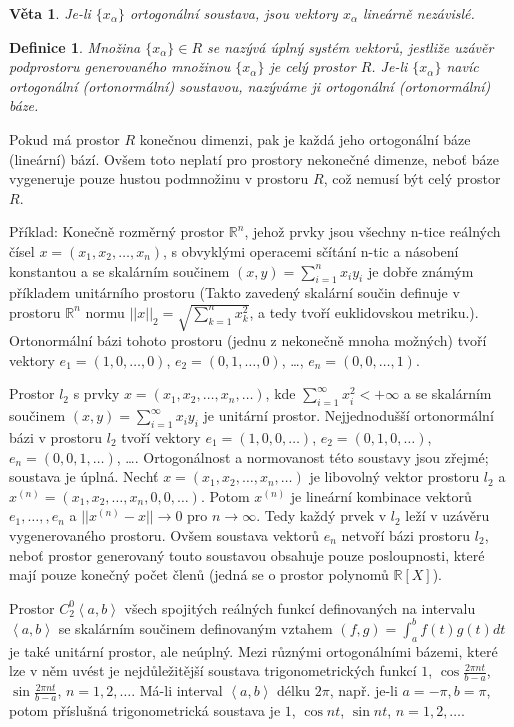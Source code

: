 \documentclass[a4paper, 11pt]{report}
\newtheorem{mydef}{Definice}[chapter]
\newtheorem{veta}{Věta}[chapter]
\begin{document}
\begin{veta}
Je-li $\{x_\alpha\}$ ortogonální soustava, jsou vektory $x_\alpha$ lineárně nezávislé.
\end{veta}

\begin{mydef}
Množina $\{x_\alpha\} \in R$ se nazývá úplný systém vektorů, jestliže uzávěr podprostoru generovaného množinou $\{x_\alpha\}$ je celý prostor $R$. Je-li $\{x_\alpha\}$ navíc ortogonální (ortonormální) soustavou, nazýváme ji \emph{ortogonální (ortonormální) báze}.
\end{mydef}

Pokud má prostor $R$ konečnou dimenzi, pak je každá jeho ortogonální báze (lineární) bází. Ovšem toto neplatí pro prostory nekonečné dimenze, neboť báze vygeneruje pouze hustou podmnožinu v prostoru $R$, což nemusí být celý prostor $R$.

Příklad: Konečně rozměrný prostor $\mathbb{R}^n$, jehož prvky jsou všechny n-tice reálných čísel
$x = (x_1, x_2, \dots, x_n)$,
s obvyklými operacemi sčítání n-tic a násobení konstantou a se skalárním součinem
$(x, y) = \sum\limits_{i = 1}^n x_i y_i$
je dobře známým příkladem unitárního prostoru (Takto zavedený skalární součin definuje v prostoru $\mathbb{R}^n$ normu $||x||_2 = \sqrt{\sum\limits_{k=1}^n x_k^2}$,
a tedy tvoří euklidovskou metriku.). Ortonormální bázi tohoto prostoru (jednu z nekonečně mnoha možných) tvoří vektory
$ e_1 = (1, 0, \dots, 0) $,
$ e_2 = (0, 1, \dots, 0) $,
\dots,
$ e_n = (0, 0, \dots, 1) $.

Prostor $l_2$ s prvky
$x = (x_1, x_2, \dots, x_n, \dots)$, kde $\sum\limits_{i=1}^\infty x_i^2 < + \infty$
a se skalárním součinem $(x, y) = \sum\limits_{i=1}^\infty x_i y_i$
je unitární prostor. Nejjednodušší ortonormální bázi v prostoru $l_2$ tvoří vektory
$ e_1 = (1, 0, 0, \dots) $,
$ e_2 = (0, 1, 0, \dots) $,
$ e_n = (0, 0, 1, \dots) $,
\dots.
Ortogonálnost a normovanost této soustavy jsou zřejmé; soustava je úplná. Nechť $x = (x_1, x_2, \dots, x_n, \dots)$ je libovolný vektor prostoru $l_2$ a $x^{(n)} = (x_1, x_2, \dots, x_n, 0, 0, \dots)$. Potom $x^{(n)}$ je lineární kombinace vektorů $e_1, \dots, ,e_n$ a $||x^{(n)} - x|| \to 0$ pro $n \to \infty$.
Tedy každý prvek v $l_2$ leží v uzávěru vygenerovaného prostoru. Ovšem soustava vektorů $e_n$ netvoří bázi prostoru $l_2$, neboť prostor generovaný touto soustavou obsahuje pouze posloupnosti, které mají pouze konečný počet členů (jedná se o prostor polynomů $\mathbb{R}[X]$).

Prostor $C_2^0 \left<a,b\right>$ všech spojitých reálných funkcí definovaných na intervalu $\left<a, b\right>$ se skalárním součinem definovaným vztahem $(f,g) = \int_a^b f(t)g(t) dt$ je také unitární prostor, ale neúplný. Mezi různými ortogonálními bázemi, které lze v něm uvést je nejdůležitější soustava trigonometrických funkcí
$1$, $\cos\frac{2\pi nt}{b-a}$, $\sin\frac{2\pi nt}{b-a}$, $n=1, 2, \dots$.
Má-li interval $\left<a,b\right>$ délku $2\pi$, např. je-li $a=-\pi, b = \pi$, potom příslušná trigonometrická soustava je 
$1$, $\cos nt$, $\sin nt$, $n=1, 2, \dots$.
\end{document}
